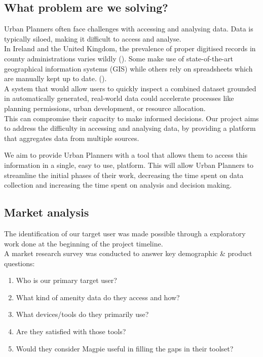 \subsection{What problem are we solving?}
Urban Planners often face challenges with accessing and analysing data. Data is
typically siloed, making it difficult to access and analyse.\\
In Ireland and the United Kingdom, the prevalence of proper digitised records in county
administrations varies wildly (\cite{WebAccessibilityIreland}). Some make use of state-of-the-art geographical information systems (GIS) while others rely on spreadsheets which are manually kept up to date. (\cite{clark2002amenities}). \\
A system that would allow users to quickly inspect a combined dataset grounded in
automatically generated, real-world data could accelerate processes like planning permissions, urban development, or resource allocation.\\
This can compromise their capacity to make informed decisions. Our project aims to address the difficulty in accessing and analysing data, by providing a platform that
aggregates data from multiple sources.

We aim to provide Urban Planners with a tool that allows them to access this
information in a single, easy to use, platform. This will allow Urban Planners
to streamline the initial phases of their work, decreasing the time spent on
data collection and increasing the time spent on analysis and decision making.

\subsection{Market analysis}
The identification of our target user was made possible through a exploratory work done at the beginning of the project timeline.\\
A market research survey was conducted to answer key demographic \& product questions:
\begin{enumerate}
    \item Who is our primary target user?
    \item What kind of amenity data do they access and how?
    \item What devices/tools do they primarily use?
    \item Are they satisfied with those tools?
    \item Would they consider Magpie useful in filling the gaps in their toolset?
\end{enumerate}

\newpage{}